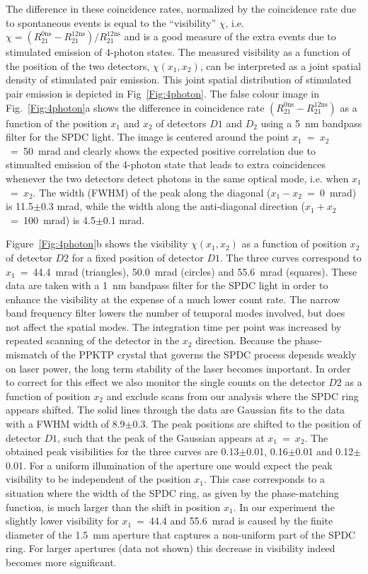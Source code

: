 The difference in these coincidence rates, normalized by the coincidence rate due to spontaneous events is equal to the ``visibility'' $\chi$, i.e. $\chi = (R_{21}^{0\mathrm{ns}} - R_{21}^{12\mathrm{ns}})/R_{21}^{12\mathrm{ns}}$ and is a good measure of the extra events due to stimulated emission of 4-photon states. The measured visibility as a function of the position of the two detectors, $\chi(x_1,x_2)$, can be interpreted as a joint spatial density of stimulated pair emission. This joint spatial distribution of stimulated pair emission is depicted in Fig~\ref{Fig:4photon}. The false colour image in Fig.~\ref{Fig:4photon}a shows the difference in coincidence rate $(R_{21}^{0\mathrm{ns}} - R_{21}^{12\mathrm{ns}})$ as a function of the position $x_1$ and $x_2$ of detectors $D1$ and $D_2$ using a 5~nm bandpass filter for the SPDC light. The image is centered around the point $x_1$~=~$x_2$~=~50~mrad and clearly shows the expected positive correlation due to stimualted emission of the 4-photon state that leads to extra coincidences whenever the two detectors detect photons in the same optical mode, i.e. when $x_1$~=~$x_2$. The width (FWHM) of the peak along the diagonal ($x_1-x_2$~=~0~mrad) is 11.5$\pm$0.3 mrad, while the width along the anti-diagonal direction ($x_1+x_2$~=~100~mrad) is 4.5$\pm$0.1 mrad.

Figure~\ref{Fig:4photon}b shows the visibility $\chi(x_1,x_2)$ as a function of position $x_2$ of detector $D2$ for a fixed position of detector $D1$. The three curves correspond to $x_1$~=~44.4~mrad (triangles), 50.0~mrad (circles) and 55.6~mrad (squares). These data are taken with a 1~nm bandpass filter for the SPDC light in order to enhance the visibility at the expense of a much lower count rate. The narrow band frequency filter lowers the number of temporal modes involved, but does not affect the spatial modes. The integration time per point was increased by repeated scanning of the detector in the $x_2$ direction. Because the phase-mismatch of the PPKTP crystal that governs the SPDC process depends weakly on laser power, the long term stability of the laser becomes important. In order to correct for this effect we also monitor the single counts on the detector $D2$ as a function of position $x_2$ and exclude scans from our analysis where the SPDC ring appears shifted. The solid lines through the data are Gaussian fits to the data with a FWHM width of 8.9$\pm$0.3. The peak positions are shifted to the position of detector $D1$, such that the peak of the Gaussian appears at $x_1$~=~$x_2$. The obtained peak visibilities for the three curves are 0.13$\pm$0.01, 0.16$\pm$0.01 and 0.12$\pm$0.01. For a uniform illumination of the aperture one would expect the peak visibility to be independent of the position $x_1$. This case corresponds to a situation where the width of the SPDC ring, as given by the phase-matching function, is much larger than the shift in position $x_1$. In our experiment the slightly lower visibility for $x_1$~=~44.4 and 55.6~mrad is caused by the finite diameter of the 1.5~mm aperture that captures a non-uniform part of the SPDC ring. For larger apertures (data not shown) this decrease in visibility indeed becomes more significant.

